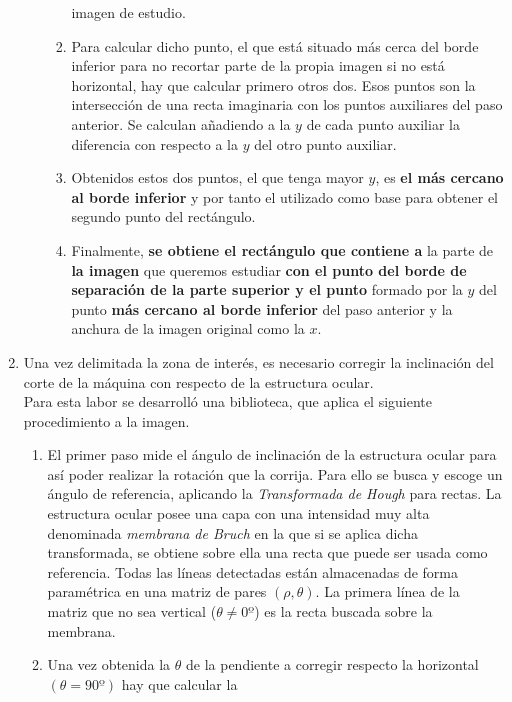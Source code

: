\begin{enumerate}
\begin{enumerate}[label*=\arabic*.]
\begin{enumerate}[label*=\arabic*.]
      imagen de estudio.
    \item Para calcular dicho punto, el que está situado más cerca del
      borde inferior para no recortar parte de la propia imagen si no
      está horizontal, hay que calcular primero otros dos. Esos puntos
      son la intersección de una recta imaginaria con los puntos
      auxiliares del paso anterior. Se calculan añadiendo a la $y$ de
      cada punto auxiliar la diferencia con respecto a la $y$ del otro
      punto auxiliar.
    \item Obtenidos estos dos puntos, el que tenga mayor $y$, es
      \textbf{el más cercano al borde inferior} y por tanto el
      utilizado como base para obtener el segundo punto del
      rectángulo.
    \item Finalmente, \textbf{se obtiene el rectángulo que contiene a}
      la parte de \textbf{la imagen} que queremos estudiar \textbf{con
        el punto del borde de separación de la parte superior y el
        punto} formado por la $y$ del punto \textbf{más cercano al
        borde inferior} del paso anterior y la anchura de la imagen
      original como la $x$.
    \end{enumerate}
  \end{enumerate}
\item Una vez delimitada la zona de interés, es necesario corregir
  la inclinación del corte de la máquina con respecto de la 
  estructura ocular. \\
  Para esta labor se desarrolló una biblioteca, que aplica el
  siguiente procedimiento a la imagen.
  \begin{enumerate}[label*=\arabic*.]
  \item El primer paso mide el ángulo de inclinación de la
    estructura ocular para así poder realizar la rotación que la corrija.
    Para ello se busca y escoge un ángulo de referencia, aplicando
    la \emph{Transformada de Hough} para rectas. La estructura ocular
    posee una capa con una intensidad muy alta denominada
    \emph{membrana de Bruch} en la que si se aplica dicha
    transformada, se obtiene sobre ella una recta que puede ser usada
    como referencia. Todas las líneas detectadas están almacenadas de
    forma paramétrica en una matriz de pares
    $\left( \rho, \theta \right)$. La primera línea de la matriz que
    no sea vertical ($\theta \neq 0º$) es la recta buscada sobre la
    membrana.
  \item Una vez obtenida la $\theta$ de la pendiente a corregir respecto la
    horizontal $\left( \theta = 90º \right)$ hay que calcular la

\end{enumerate}
\end{enumerate}
